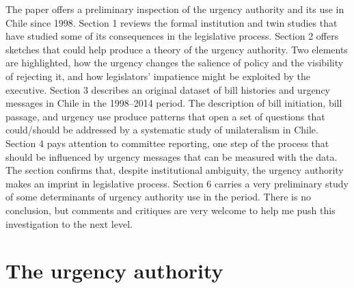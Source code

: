 \documentclass[letter,12pt]{article}
\begin{document}
The paper offers a preliminary inspection of the urgency authority and its use in Chile since 1998. Section 1 reviews the formal institution and twin studies that have studied some of its consequences in the legislative process. Section 2 offers sketches that could help produce a theory of the urgency authority. Two elements are highlighted, how the urgency changes the salience of policy and the visibility of rejecting it, and how legislators' impatience might be exploited by the executive. Section 3 describes an original dataset of bill histories and urgency messages in Chile in the 1998--2014 period. The description of  bill initiation, bill passage, and urgency use produce patterns that open a set of questions that could/should be addressed by a systematic study of unilateralism in Chile. Section 4 pays attention to committee reporting, one step of the process that should be influenced by urgency messages that can be measured with the data. The section confirms that, despite institutional ambiguity, the urgency authority makes an imprint in legislative process. Section 6 carries a very preliminary study of some determinants of urgency authority use in the period. There is no conclusion, but comments and critiques are very welcome to help me push this investigation to the next level. 


\section{The urgency authority}
\end{document}
